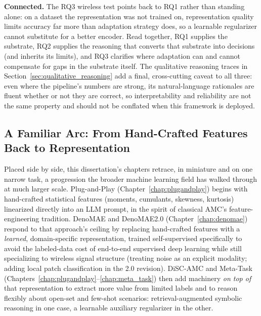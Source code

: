 \textbf{Connected.} The RQ3 wireless test points back to RQ1 rather than standing alone: on a dataset the representation was not trained on, representation quality limits accuracy far more than adaptation strategy does, so a learnable regularizer cannot substitute for a better encoder. Read together, RQ1 supplies the substrate, RQ2 supplies the reasoning that converts that substrate into decisions (and inherits its limits), and RQ3 clarifies where adaptation can and cannot compensate for gaps in the substrate itself. The qualitative reasoning traces in Section~\ref{sec:qualitative_reasoning} add a final, cross-cutting caveat to all three: even where the pipeline's numbers are strong, its natural-language rationales are fluent whether or not they are correct, so interpretability and reliability are not the same property and should not be conflated when this framework is deployed.

\subsection{A Familiar Arc: From Hand-Crafted Features Back to Representation}
\label{sec:familiar_arc}

Placed side by side, this dissertation's chapters retrace, in miniature and on one narrow task, a progression the broader machine learning field has walked through at much larger scale. Plug-and-Play (Chapter~\ref{chap:plugandplay}) begins with hand-crafted statistical features (moments, cumulants, skewness, kurtosis) linearized directly into an LLM prompt, in the spirit of classical AMC's feature-engineering tradition. DenoMAE and DenoMAE2.0 (Chapter~\ref{chap:denomae}) respond to that approach's ceiling by replacing hand-crafted features with a \emph{learned}, domain-specific representation, trained self-supervised specifically to avoid the labeled-data cost of end-to-end supervised deep learning while still specializing to wireless signal structure (treating noise as an explicit modality; adding local patch classification in the 2.0 revision). DiSC-AMC and Meta-Task (Chapters~\ref{chap:plugandplay}--\ref{chap:meta_task}) then add machinery \emph{on top of} that representation to extract more value from limited labels and to reason flexibly about open-set and few-shot scenarios: retrieval-augmented symbolic reasoning in one case, a learnable auxiliary regularizer in the other.


